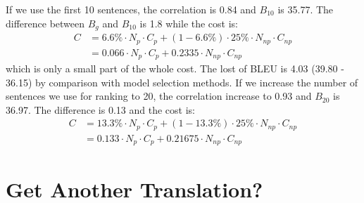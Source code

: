 \documentclass[11pt]{article}
\begin{document}
  If we use the first 10 sentences,  the correlation is 0.84 and  $B_{10}$ is 35.77. The difference between $B_{g}$ and $B_{10}$ is 1.8 while the cost is: \\
  \begin{align*}
  C& = 6.6\% \cdot N_{p}\cdot C_{p}  + (1-6.6\% )\cdot 25\% \cdot N_{np} \cdot C_{np}\\
   & = 0.066 \cdot N_{p}\cdot C_{p}  + 0.2335 \cdot N_{np} \cdot C_{np}
  \end{align*}
    which is only a small part of the whole cost. The lost of BLEU is 4.03 (39.80 - 36.15) by comparison with model selection methods.  If we increase the number of sentences we use for ranking to 20, the correlation increase to 0.93 and $B_{20}$ is 36.97. The difference is 0.13 and the cost is:
\begin{align*}
C& = 13.3\% \cdot N_{p}\cdot C_{p}  + (1-13.3\% )\cdot 25\% \cdot N_{np} \cdot C_{np}\\
   & = 0.133 \cdot N_{p}\cdot C_{p}  + 0.21675 \cdot N_{np} \cdot C_{np}
\end{align*}

    
     
%
%
%




 
 \section{Get Another Translation?}
 
 
\end{document}
